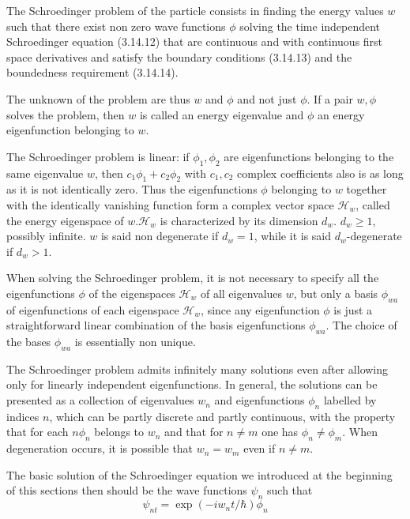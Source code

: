\documentclass{article}
\begin{document}
The Schroedinger problem of the particle consists in finding the energy values $w$ such that there exist non zero wave functions $\phi$ solving the time independent Schroedinger equation (3.14.12) that are continuous and with continuous first space derivatives and satisfy the boundary conditions (3.14.13) and the boundedness requirement (3.14.14).

The unknown of the problem are thus $w$ and $\phi$ and not just $\phi$. If a pair $w, \phi$ solves the problem, then $w$ is called an energy eigenvalue and $\phi$ an energy eigenfunction belonging to $w$.

The Schroedinger problem is linear: if $\phi_{1}, \phi_{2}$ are eigenfunctions belonging to the same eigenvalue $w$, then $c_{1} \phi_{1}+c_{2} \phi_{2}$ with $c_{1}, c_{2}$ complex coefficients also is as long as it is not identically zero. Thus the eigenfunctions $\phi$ belonging to $w$ together with the identically vanishing function form a complex vector space $\mathcal{H}_{w}$, called the energy eigenspace of $w . \mathcal{H}_{w}$ is characterized by its dimension $d_{w}$. $d_{w} \geq 1$, possibly infinite. $w$ is said non degenerate if $d_{w}=1$, while it is said $d_{w}$-degenerate if $d_{w}>1$.

When solving the Schroedinger problem, it is not necessary to specify all the eigenfunctions $\phi$ of the eigenspaces $\mathcal{H}_{w}$ of all eigenvalues $w$, but only a basis $\phi_{w a}$ of eigenfunctions of each eigenspace $\mathcal{H}_{w}$, since any eigenfunction $\phi$ is just a straightforward linear combination of the basis eigenfunctions $\phi_{w a}$. The choice of the bases $\phi_{w a}$ is essentially non unique.

The Schroedinger problem admits infinitely many solutions even after allowing only for linearly independent eigenfunctions. In general, the solutions can be presented as a collection of eigenvalues $w_{n}$ and eigenfunctions $\phi_{n}$ labelled by indices $n$, which can be partly discrete and partly continuous, with the property that for each $n \phi_{n}$ belongs to $w_{n}$ and that for $n \neq m$ one has $\phi_{n} \neq \phi_{m}$. When degeneration occurs, it is possible that $w_{n}=w_{m}$ even if $n \neq m$.

The basic solution of the Schroedinger equation we introduced at the beginning of this sections then should be the wave functions $\psi_{n}$ such that
$$
\begin{equation*}
\psi_{n t}=\exp \left(-i w_{n} t / \hbar\right) \phi_{n} \tag{3.14.15}
\end{equation*}
$$
\end{document}
